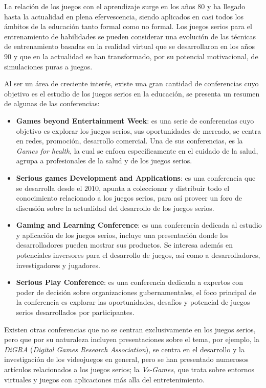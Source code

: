 La relación de los juegos con el aprendizaje surge en los años $80$ y ha llegado
hasta la actualidad en plena efervescencia, siendo aplicados en casi todos los
ámbitos de la educación tanto formal como no formal. Los juegos serios para el
entrenamiento de habilidades se pueden considerar una evolución de las técnicas
de entrenamiento basadas en la realidad virtual que se desarrollaron en los años
$90$ y que en la actualidad se han transformado, por su potencial motivacional,
de simulaciones puras a juegos\cite{videojuegos:gonzaleztardon}.

Al ser un área de creciente interés, existe una gran cantidad de conferencias
cuyo objetivo es el estudio de los juegos serios en la educación, se presenta un
resumen de algunas de las conferencias:

\begin{itemize}
\item \textbf{Games beyond Entertainment Week}: es una serie de conferencias
    cuyo objetivo es explorar los juegos serios, sus oportunidades de mercado,
    se centra en redes, promoción, desarrollo comercial. Una de sus
    conferencias, es la \emph{Games for health}, la cual se enfoca
    específicamente en el cuidado de la salud, agrupa a profesionales de la
    salud y de los juegos serios\cite{games_beyond_entertainment}.
\item \textbf{Serious games Development and Applications}: es una conferencia
    que se desarrolla desde el $2010$, apunta a coleccionar y distribuir todo el
    conocimiento relacionado a los juegos serios, para así proveer un foro de
    discusión sobre la actualidad del desarrollo de los juegos
    serios\cite{sgda}.
\item \textbf{Gaming and Learning Conference}: es una conferencia dedicada al
    estudio y aplicación de los juegos serios, incluye una presentación donde
    los desarrolladores pueden mostrar sus productos. Se interesa además en
    potenciales inversores para el desarrollo de juegos, así como a
    desarrolladores, investigadores y jugadores\cite{gala}.
\item \textbf{Serious Play Conference}: es una conferencia dedicada a expertos
    con poder de decisión sobre organizaciones gubernamentales, el foco
    principal de la conferencia es explorar las oportunidades, desafíos y
    potencial de juegos serios desarrollados por
    participantes\cite{seriousplay}.
\end{itemize}

Existen otras conferencias que no se centran exclusivamente en los juegos
serios, pero que por su naturaleza incluyen presentaciones sobre el tema, por
ejemplo, la \emph{DiGRA} (\textit{Digital Games Research Association}), se
centra en el desarrollo y la investigación de los videojuegos en general, pero
se han presentado numerosos artículos relacionados a  los juegos serios; la
\emph{Vs-Games}, que trata sobre entornos virtuales y juegos con  aplicaciones
más alla del entretenimiento.

